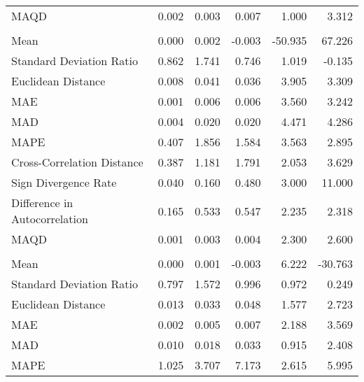 \begin{landscape}
\begin{ThreePartTable}
\begin{longtable}[t]{lrrrrr}
\hspace{1em}MAQD & 0.002 & 0.003 & 0.007 & 1.000 & 3.312\\
\addlinespace[0.5em]
\multicolumn{6}{l}{\textbf{FRA}}\\
\hline
\hspace{1em}Mean & 0.000 & 0.002 & -0.003 & -50.935 & 67.226\\
\hspace{1em}Standard Deviation Ratio & 0.862 & 1.741 & 0.746 & 1.019 & -0.135\\
\hspace{1em}Euclidean Distance & 0.008 & 0.041 & 0.036 & 3.905 & 3.309\\
\hspace{1em}MAE & 0.001 & 0.006 & 0.006 & 3.560 & 3.242\\
\hspace{1em}MAD & 0.004 & 0.020 & 0.020 & 4.471 & 4.286\\
\hspace{1em}MAPE & 0.407 & 1.856 & 1.584 & 3.563 & 2.895\\
\hspace{1em}Cross-Correlation Distance & 0.387 & 1.181 & 1.791 & 2.053 & 3.629\\
\hspace{1em}Sign Divergence Rate & 0.040 & 0.160 & 0.480 & 3.000 & \vphantom{1} 11.000\\
\hspace{1em}Difference in Autocorrelation & 0.165 & 0.533 & 0.547 & 2.235 & 2.318\\
\hspace{1em}MAQD & 0.001 & 0.003 & 0.004 & 2.300 & 2.600\\
\addlinespace[0.5em]
\multicolumn{6}{l}{\textbf{GBR}}\\
\hline
\hspace{1em}Mean & 0.000 & 0.001 & -0.003 & 6.222 & -30.763\\
\hspace{1em}Standard Deviation Ratio & 0.797 & 1.572 & 0.996 & 0.972 & 0.249\\
\hspace{1em}Euclidean Distance & 0.013 & 0.033 & 0.048 & 1.577 & 2.723\\
\hspace{1em}MAE & 0.002 & 0.005 & 0.007 & 2.188 & 3.569\\
\hspace{1em}MAD & 0.010 & 0.018 & 0.033 & 0.915 & 2.408\\
\hspace{1em}MAPE & 1.025 & 3.707 & 7.173 & 2.615 & 5.995\\

\end{longtable}
\end{ThreePartTable}
\end{landscape}
